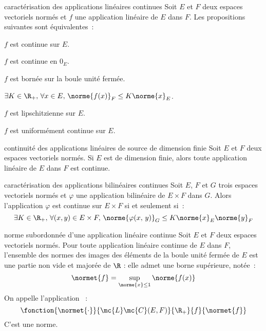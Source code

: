 \begin{adjustwidth}{-3cm}{-3cm}
\begin{theoreme}{4.65}{caractérisation des applications linéaires continues}
    Soit $E$ et $F$ deux espaces vectoriels normés et $f$ une application linéaire de $E$ dans $F$. Les propositions suivantes sont équivalentes~:
    \begin{enumeratebf}
        \item $f$ est continue sur $E$.
        \item $f$ est continue en $0_E$.
        \item $f$ est bornée sur la boule unité fermée.
        \item $\exists K \in \R_+,\, \forall x \in E,\, \norme{f(x)}_F \leq K\norme{x}_E$.
        \item $f$ est lipschitzienne sur $E$.
        \item $f$ est uniformément continue sur $E$.
    \end{enumeratebf}
\end{theoreme}

\begin{theoreme}{4.69}{continuité des applications linéaires de source de dimension finie}
    Soit $E$ et $F$ deux espaces vectoriels normés. Si $E$ est de dimension finie, alors toute application linéaire de $E$ dans $F$ est continue.
\end{theoreme}

\begin{theoreme}{4.71}{caractérisation des applications bilinéaires continues}
    Soit $E$, $F$ et $G$ trois espaces vectoriels normés et $\varphi$ une application bilinéaire de $E \times F$ dans $G$. Alors l’application $\varphi$ est continue sur $E \times F$ si et seulement si~:
    $$\exists K \in \R_+,\, \forall (x,y) \in E \times F,\, \norme{\varphi(x,\, y)}_G \leq K \norme{x}_E \norme{y}_F$$
\end{theoreme}

\begin{definition}{4.75}{norme subordonnée d'une application linéaire continue}
    Soit $E$ et $F$ deux espaces vectoriels normés. Pour toute application linéaire continue de $E$ dans $F$, l’ensemble des normes des images des éléments de la boule unité fermée de $E$ est une partie non vide et majorée de $\R$ : elle admet une borne supérieure, notée~:
    $$\normet{f} = \sup_{\norme{x} \leq 1} \norme{f(x)}$$
    On appelle  l'application ~: 
    $$\fonction{\normet{\cdot}}{\mc{L}\mc{C}(E,F)}{\R_+}{f}{\normet{f}}$$
    C'est une norme.
\end{definition}


\end{adjustwidth}
